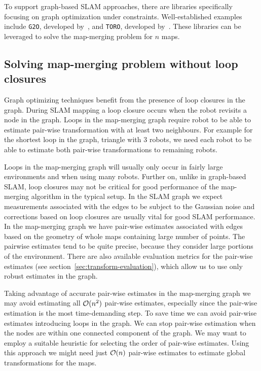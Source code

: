 To support graph-based \gls{SLAM} approaches, there are libraries specifically focusing on graph optimization under constraints. Well-established examples include \texttt{G2O}, developed by~\citet{kummerle2011g2o}, and \texttt{TORO}, developed by~\citet{grisetti2007toro}. These libraries can be leveraged to solve the map-merging problem for $n$ maps.

\subsection{Solving map-merging problem without loop closures}

Graph optimizing techniques benefit from the presence of loop closures in the graph. During \gls{SLAM} mapping a loop closure occurs when the robot revisits a node in the graph. Loops in the map-merging graph require robot to be able to estimate pair-wise transformation with at least two neighbours. For example for the shortest loop in the graph, triangle with $3$ robots, we need each robot to be able to estimate both pair-wise transformations to remaining robots.

Loops in the map-merging graph will usually only occur in fairly large environments and when using many robots. Further on, unlike in graph-based \gls{SLAM}, loop closures may not be critical for good performance of the map-merging algorithm in the typical setup. In the \gls{SLAM} graph we expect measurements associated with the edges to be subject to the Gaussian noise and corrections based on loop closures are usually vital for good \gls{SLAM} performance. In the map-merging graph we have pair-wise estimates associated with edges based on the geometry of whole maps containing large number of points. The pairwise estimates tend to be quite precise, because they consider large portions of the environment. There are also available evaluation metrics for the pair-wise estimates (see section~\ref{sec:transform-evaluation}), which allow us to use only robust estimates in the graph.

Taking advantage of accurate pair-wise estimates in the map-merging graph we may avoid estimating all $\operatorname{\mathcal{O}}(n^2)$ pair-wise estimates, especially since the pair-wise estimation is the most time-demanding step. To save time we can avoid pair-wise estimates introducing loops in the graph. We can stop pair-wise estimation when the nodes are within one connected component of the graph. We may want to employ a suitable heuristic for selecting the order of pair-wise estimates. Using this approach we might need just $\operatorname{\mathcal{O}}(n)$ pair-wise estimates to estimate global transformations for the maps.

